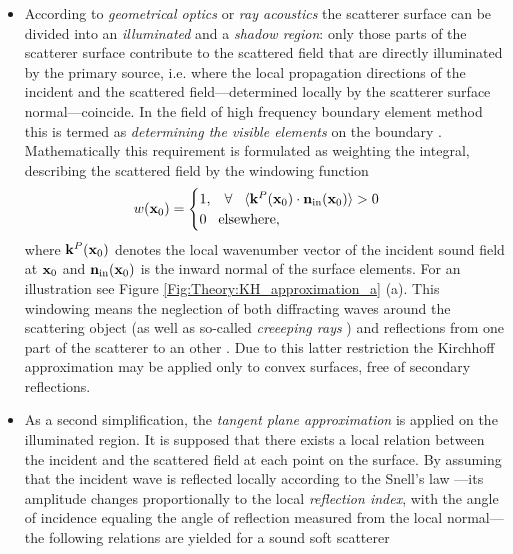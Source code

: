 \begin{itemize}
%
\item According to \emph{geometrical optics} or \emph{ray acoustics} the scatterer surface can be divided into an \emph{illuminated} and a \emph{shadow region}: only those parts of the scatterer surface contribute to the scattered field that are directly illuminated by the primary source, i.e. where the local propagation directions of the incident and the scattered field---determined locally by the scatterer surface normal---coincide.
In the field of high frequency boundary element method this is termed as \emph{determining the visible elements} on the boundary \cite{Herrin2003}.
Mathematically this requirement is formulated as weighting the integral, describing the scattered field by the windowing function
\begin{equation}
w(\mathbf{x}_0) = \begin{cases}
                        1, \hspace{3mm} \forall \hspace{3mm} \langle \mathbf{k}^P(\mathbf{x}_0) \cdot \mathbf{n}_{\mathrm{in}}(\mathbf{x}_0) \rangle > 0 \\
                        0  \hspace{3mm} \text{elsewhere},
                    \end{cases}
\label{eq:theory:windowing_function}
\end{equation}
where $\mathbf{k}^P(\mathbf{x}_0)$ denotes the local wavenumber vector of the incident sound field at $\mathbf{x}_0$ and $ \mathbf{n}_{\mathrm{in}}(\mathbf{x}_0)$ is the inward normal of the surface elements. For an illustration see Figure \ref{Fig:Theory:KH_approximation_a} (a).
%
This windowing means the neglection of both diffracting waves around the scattering object (as well as so-called \emph{creeeping rays} \cite{Bleistein1984}) and reflections from one part of the scatterer to an other \cite{Pignier2015}. 
Due to this latter restriction the Kirchhoff approximation may be applied only to convex surfaces, free of secondary reflections.
%
\item As a second simplification, the \emph{tangent plane approximation} is applied on the illuminated region.
It is supposed that there exists a local relation between the incident and the scattered field at each point on the surface.
By assuming that the incident wave is reflected locally according to the Snell's law  \cite{Voronich2007}---its amplitude changes proportionally to the local \emph{reflection index}, with the angle of incidence equaling the angle of reflection measured from the local normal---the following relations are yielded for a sound soft scatterer \cite{Bleistein1984, Bleistein2000, Pike2002}

\end{itemize}
